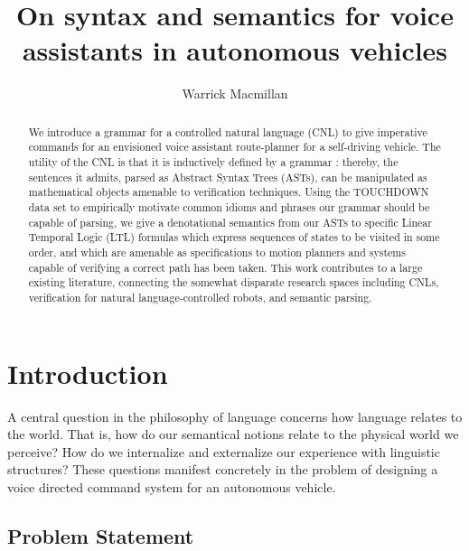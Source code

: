 \documentclass{article}
\author{Warrick Macmillan}
\title{On syntax and semantics for voice assistants in autonomous vehicles}
\begin{document}
\begin{titlepage}

\maketitle

\begin{abstract}

We introduce a grammar for a controlled natural language (CNL) to give
imperative commands for an envisioned voice assistant route-planner for a
self-driving vehicle. The utility of the CNL is that it is inductively defined
by a grammar : thereby, the sentences it admits, parsed as Abstract Syntax Trees
(ASTs), can be manipulated as mathematical objects amenable to verification
techniques. Using the TOUCHDOWN data set to empirically motivate common idioms
and phrases our grammar should be capable of parsing, we give a denotational
semantics from our ASTs to specific Linear Temporal Logic (LTL) formulas which
express sequences of states to be visited in some order, and which are amenable
as specifications to motion planners and systems capable of verifying a correct
path has been taken. This work contributes to a large existing literature,
connecting the somewhat disparate research spaces including CNLs, verification
for natural language-controlled robots, and semantic parsing.

\end{abstract}

\vfill

\thispagestyle{empty}
\end{titlepage}

\newpage
\tableofcontents

\newpage
\setcounter{page}{1}


\section{Introduction}

A central question in the philosophy of language concerns how language relates
to the world. That is, how do our semantical notions relate to the physical
world we perceive? How do we internalize and externalize our experience with
linguistic structures? These questions manifest concretely in the problem of
designing a voice directed command system for an autonomous vehicle.

\subsection{Problem Statement}
\end{document}
